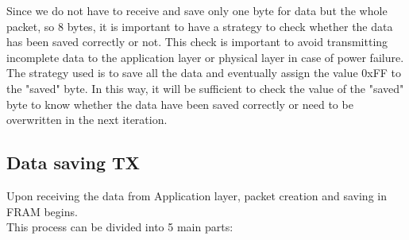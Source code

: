Since we do not have to receive and save only one byte for data but the whole packet, so 8 bytes, it is important to have a strategy to check whether the data has been saved correctly or not. This check is important to avoid transmitting incomplete data to the application layer or physical layer in case of power failure. The strategy used is to save all the data and eventually assign the value 0xFF to the "saved" byte. In this way, it will be sufficient to check the value of the "saved" byte to know whether the data have been saved correctly or need to be overwritten in the next iteration.

\subsection{Data saving TX}
Upon receiving the data from Application layer, packet creation and saving in FRAM begins.\\
This process can be divided into 5 main parts:\\

